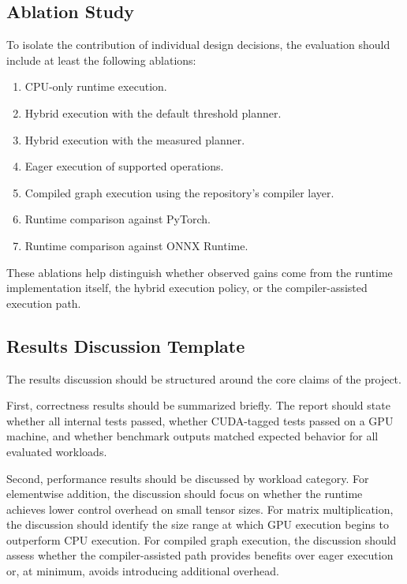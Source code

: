 \documentclass[12pt]{article}
\begin{document}
\subsection{Ablation Study}

To isolate the contribution of individual design decisions, the evaluation should include at least the following ablations:
\begin{enumerate}
    \item CPU-only runtime execution.
    \item Hybrid execution with the default threshold planner.
    \item Hybrid execution with the measured planner.
    \item Eager execution of supported operations.
    \item Compiled graph execution using the repository's compiler layer.
    \item Runtime comparison against PyTorch.
    \item Runtime comparison against ONNX Runtime.
\end{enumerate}

These ablations help distinguish whether observed gains come from the runtime implementation itself, the hybrid execution policy, or the compiler-assisted execution path.

\subsection{Results Discussion Template}

The results discussion should be structured around the core claims of the project.

First, correctness results should be summarized briefly. The report should state whether all internal tests passed, whether CUDA-tagged tests passed on a GPU machine, and whether benchmark outputs matched expected behavior for all evaluated workloads.

Second, performance results should be discussed by workload category. For elementwise addition, the discussion should focus on whether the runtime achieves lower control overhead on small tensor sizes. For matrix multiplication, the discussion should identify the size range at which GPU execution begins to outperform CPU execution. For compiled graph execution, the discussion should assess whether the compiler-assisted path provides benefits over eager execution or, at minimum, avoids introducing additional overhead.
\end{document}
